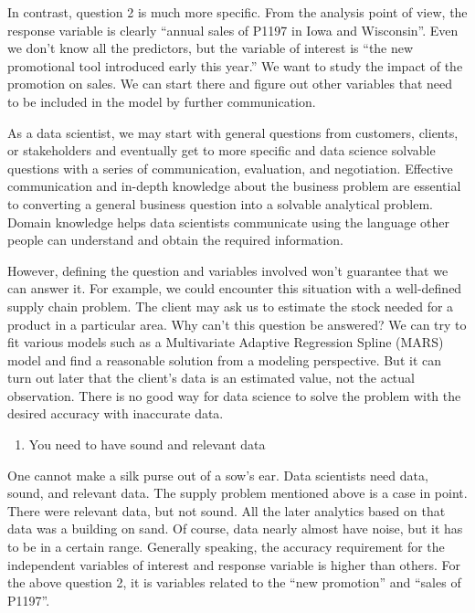 \documentclass[12pt,]{krantz}
\providecommand{\tightlist}{%
  \setlength{\itemsep}{0pt}\setlength{\parskip}{0pt}}
\begin{document}
In contrast, question 2 is much more specific. From the analysis point of view, the response variable is clearly ``annual sales of P1197 in Iowa and Wisconsin''. Even we don't know all the predictors, but the variable of interest is ``the new promotional tool introduced early this year.'' We want to study the impact of the promotion on sales. We can start there and figure out other variables that need to be included in the model by further communication.

As a data scientist, we may start with general questions from customers, clients, or stakeholders and eventually get to more specific and data science solvable questions with a series of communication, evaluation, and negotiation. Effective communication and in-depth knowledge about the business problem are essential to converting a general business question into a solvable analytical problem. Domain knowledge helps data scientists communicate using the language other people can understand and obtain the required information.

However, defining the question and variables involved won't guarantee that we can answer it. For example, we could encounter this situation with a well-defined supply chain problem. The client may ask us to estimate the stock needed for a product in a particular area. Why can't this question be answered? We can try to fit various models such as a Multivariate Adaptive Regression Spline (MARS) model and find a reasonable solution from a modeling perspective. But it can turn out later that the client's data is an estimated value, not the actual observation. There is no good way for data science to solve the problem with the desired accuracy with inaccurate data.

\begin{enumerate}
\def\labelenumi{\arabic{enumi}.}
\setcounter{enumi}{1}
\tightlist
\item
  You need to have sound and relevant data
\end{enumerate}

One cannot make a silk purse out of a sow's ear. Data scientists need data, sound, and relevant data. The supply problem mentioned above is a case in point. There were relevant data, but not sound. All the later analytics based on that data was a building on sand. Of course, data nearly almost have noise, but it has to be in a certain range. Generally speaking, the accuracy requirement for the independent variables of interest and response variable is higher than others. For the above question 2, it is variables related to the ``new promotion'' and ``sales of P1197''.
\end{document}
